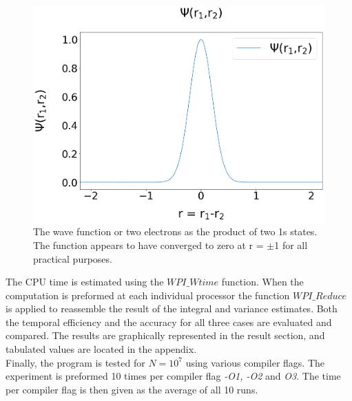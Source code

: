 \documentclass[%
reprint,nofootinbib,
amsmath,amssymb,
aps,
]{revtex4-1}
\begin{document}
\begin{figure}[!hb]
	\includegraphics[width=\columnwidth]{Wavefunction.png}
	\caption{\label{wavefigure} The wave function or two electrons as the product of two 1s states. The function appears to have converged to zero at r = $\pm$1 for all practical purposes.}
\end{figure}
 The CPU time is estimated using the $WPI\_Wtime$ function. When the computation is preformed at each individual processor the function $WPI\_Reduce$ is applied to reassemble the result of the integral and variance estimates. Both the temporal efficiency and the accuracy for all three cases are evaluated and compared. The results are graphically represented in the result section, and tabulated values are located in the appendix. \\ \indent 
 Finally, the program is tested for $N=10^7$ using various compiler flags. The experiment is preformed 10 times per compiler flag \textit{-O1, -O2} and \textit{O3}. The time per compiler flag is then given as the average of all 10 runs. 
 
\end{document}
